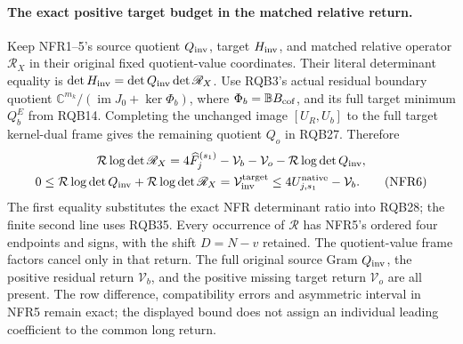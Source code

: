 \documentclass[11pt,a4paper]{article}
\begin{document}
\paragraph{The exact positive target budget in the matched relative return.}
Keep NFR1--5's source quotient $Q_{\rm inv}$, target
$H_{\rm inv}$, and matched relative operator $\mathscr R_X$
in their original fixed quotient-value coordinates. Their
literal determinant equality is
$\det H_{\rm inv}=\det Q_{\rm inv}\det\mathscr R_X$.
Use RQB3's actual residual boundary quotient
$\mathbb C^{m_k}/(\operatorname{im}J_0+\ker\Phi_b)$,
where $\Phi_b=\mathbb B B_{\rm cof}$, and its full target
minimum $Q_b^E$ from RQB14. Completing the unchanged image
$[U_R,U_b]$ to the full target kernel-dual frame gives the
remaining quotient $Q_o$ in RQB27. Therefore
\[
\begin{gathered}
 \mathcal R\log\det\mathscr R_X
   =4\widehat F_j^{(s_1)}-\mathcal V_b-\mathcal V_o
                      -\mathcal R\log\det Q_{\rm inv},\\
 0\le\mathcal R\log\det Q_{\rm inv}
          +\mathcal R\log\det\mathscr R_X
     =\mathcal V_{\rm inv}^{\rm target}
     \le4U_{j,s_1}^{\rm native}-\mathcal V_b .          \tag{NFR6}
\end{gathered}
\]
The first equality substitutes the exact NFR determinant
ratio into RQB28; the finite second line uses RQB35.
Every occurrence of $\mathcal R$ has NFR5's ordered four
endpoints and signs, with the shift $D=N-v$ retained.
The quotient-value frame factors cancel only in that return.
The full original source Gram $Q_{\rm inv}$, the positive
residual return $\mathcal V_b$, and the positive missing
target return $\mathcal V_o$ are all present. The row
difference, compatibility errors and asymmetric interval
in NFR5 remain exact; the displayed bound does not assign
an individual leading coefficient to the common long return.



\end{document}
